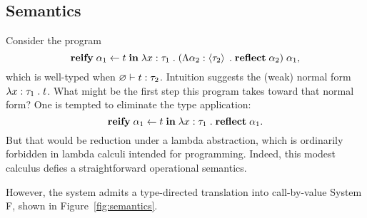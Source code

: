   \subsection{Semantics}

    Consider the program
    \[
      \mathbf{reify} \; \alpha_1 \leftarrow t \; \mathbf{in} \; \lambda x : \tau_1 \; . \; \mathopen{}\left( \Lambda \alpha_2 : \left\langle \tau_2 \right\rangle \; . \; \mathbf{reflect} \; \alpha_2 \right)\mathclose{} \; \alpha_1,
    \]
    which is well-typed when $\varnothing \vdash t : \tau_2$. Intuition suggests the (weak) normal form $\lambda x : \tau_1 \; . \; t$. What might be the first step this program takes toward that normal form? One is tempted to eliminate the type application:
    \[
      \mathbf{reify} \; \alpha_1 \leftarrow t \; \mathbf{in} \; \lambda x : \tau_1 \; . \; \mathbf{reflect} \; \alpha_1.
    \]
    But that would be reduction under a lambda abstraction, which is ordinarily forbidden in lambda calculi intended for programming. Indeed, this modest calculus defies a straightforward operational semantics.

    However, the system admits a type-directed translation into call-by-value System F, shown in Figure~\ref{fig:semantics}.

